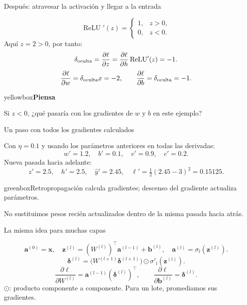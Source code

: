 \documentclass[10pt,aspectratio=169,xcolor={dvipsnames}]{beamer}
\newenvironment{caja}[1][lgraybox]{\begin{beamercolorbox}[sep=0.7em,wd=\linewidth]{#1}}{\end{beamercolorbox}}
\newcommand{\actividad}[2]{\begin{caja}[yellowbox]\textbf{#1}\par\smallskip #2\end{caja}}
\begin{document}
\begin{frame}{Después: atravesar la activación y llegar a la entrada}

\[\operatorname{ReLU}'(z)=\begin{cases}1,&z>0,\\0,&z<0.\end{cases}\]
Aquí $z=2>0$, por tanto:
\[\delta_{\rm oculta}=\frac{\partial\ell}{\partial z}
=\frac{\partial\ell}{\partial h}\operatorname{ReLU}'(z)=-1.\]
\[\frac{\partial\ell}{\partial w}=\delta_{\rm oculta}x=-2,
\qquad\frac{\partial\ell}{\partial b}=\delta_{\rm oculta}=-1.\]
\actividad{Piensa}{Si $z<0$, ¿qué pasaría con los gradientes de $w$ y $b$ en este ejemplo?}
\end{frame}

\begin{frame}{Un paso con todos los gradientes calculados}

Con $\eta=0.1$ y usando los parámetros anteriores en todas las derivadas:
\[w'=1.2,\quad b'=0.1,\quad v'=0.9,\quad c'=0.2.\]
Nueva pasada hacia adelante:
\[z'=2.5,\quad h'=2.5,\quad\hat y'=2.45,
\quad\ell'=\tfrac12(2.45-3)^2=0.15125.\]
\begin{caja}[greenbox]Retropropagación calcula gradientes; descenso del gradiente actualiza parámetros.\end{caja}
No sustituimos pesos recién actualizados dentro de la misma pasada hacia atrás.
\note{}
\end{frame}

\begin{frame}{La misma idea para muchas capas}

\[\bm a^{(0)}=\bm x,\quad
\bm z^{(l)}=(W^{(l)})^\top\bm a^{(l-1)}+\bm b^{(l)},
\quad\bm a^{(l)}=\sigma_l(\bm z^{(l)}).\]
\[\bm\delta^{(l)}=
\bigl(W^{(l+1)}\bm\delta^{(l+1)}\bigr)\odot\sigma'_l(\bm z^{(l)}).\]
\[\frac{\partial\ell}{\partial W^{(l)}}=
\bm a^{(l-1)}(\bm\delta^{(l)})^\top,
\qquad \frac{\partial\ell}{\partial\bm b^{(l)}}=\bm\delta^{(l)}.\]
$\odot$: producto componente a componente. Para un lote, promediamos sus gradientes.
\end{frame}
\end{document}
